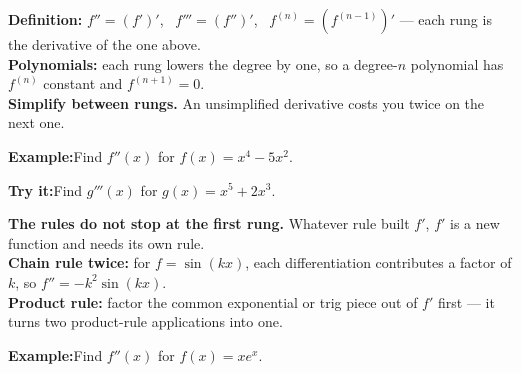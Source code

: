\documentclass[12pt]{article}
\begin{document}


\begin{formulabox}
\textbf{Definition:} $f'' = (f')'$, \ $f''' = (f'')'$, \ $f^{(n)} = (f^{(n-1)})'$
--- each rung is the derivative of the one above.\\[3pt]
\textbf{Polynomials:} each rung lowers the degree by one, so a degree-$n$
polynomial has $f^{(n)}$ constant and $f^{(n+1)} = 0$.\\[3pt]
\textbf{Simplify between rungs.} An unsimplified derivative costs you twice on
the next one.
\end{formulabox}

\begin{examplebox}
\textbf{Example:}\quad Find $f''(x)$ for $f(x) = x^4 - 5x^2$.
\end{examplebox}

\begin{tryitbox}
\textbf{Try it:}\quad Find $g'''(x)$ for $g(x) = x^5 + 2x^3$.\\[2pt]
\end{tryitbox}


\begin{formulabox}
\textbf{The rules do not stop at the first rung.} Whatever rule built $f'$,
$f'$ is a new function and needs its own rule.\\[3pt]
\textbf{Chain rule twice:} for $f = \sin(kx)$, each differentiation contributes
a factor of $k$, so $f'' = -k^2\sin(kx)$.\\[3pt]
\textbf{Product rule:} factor the common exponential or trig piece out of $f'$
first --- it turns two product-rule applications into one.
\end{formulabox}

\begin{examplebox}
\textbf{Example:}\quad Find $f''(x)$ for $f(x) = xe^x$.
\end{examplebox}
\end{document}
